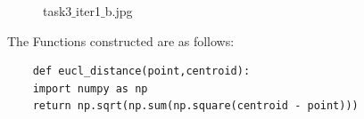 \documentclass[12pt]{article}
\newenvironment{QandA}
{
	\begin{enumerate}[label=\normalfont\arabic*.,leftmargin=2em,rightmargin=2em]\normalfont
	}
	{
	\end{enumerate}
}
\newenvironment{answered}{\setlength{\parindent}{1em}\par\normalfont}{}
\begin{document}
\begin{QandA}
{\begin{enumerate}
{\begin{answered}
	 					\begin{figure}
		\centering
  			\caption{task3$\_$iter1$\_$b.jpg}
  		\label{img32}
	\end{figure}
	The Functions constructed are as follows:
	\begin{verbatim}
	def eucl_distance(point,centroid):
    import numpy as np
    return np.sqrt(np.sum(np.square(centroid - point)))
	\end{verbatim}
	\begin{verbatim}
	

\end{verbatim}
\end{answered}}
\end{enumerate}}
\end{QandA}
\end{document}
